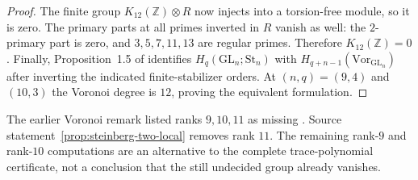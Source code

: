 \begin{proof}
The finite group $K_{12}(\mathbb Z)\otimes R$ now injects into a
torsion-free module, so it is zero. The primary parts at all primes
inverted in $R$ vanish as well: the $2$-primary part is zero, and
$3,5,7,11,13$ are regular primes. Therefore $K_{12}(\mathbb Z)=0$.
Finally, Proposition~1.5 of \cite{DEKM2026} identifies
$H_q(\mathrm{GL}_n;\mathrm{St}_n)$ with
$H_{q+n-1}(\mathrm{Vor}_{\mathrm{GL}_n})$ after inverting the
indicated finite-stabilizer orders. At $(n,q)=(9,4)$ and $(10,3)$
the Voronoi degree is $12$, proving the equivalent formulation.
\end{proof}

The earlier Voronoi remark listed ranks $9,10,11$ as missing
\cite[Remark~6.6, author-preprint p.~19]{DEKM2026}.
Source statement~\ref{prop:steinberg-two-local} removes rank $11$.
The remaining rank-$9$ and rank-$10$ computations are an alternative
to the complete trace-polynomial certificate, not a conclusion
that the still undecided group already vanishes.
